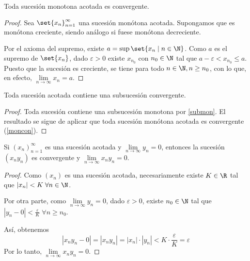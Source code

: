 \begin{proposition}
	\label{moncon}
	Toda sucesión monotona acotada es convergente.
\end{proposition}
\begin{proof}
	Sea \(\set{x_n}^{\infty}_{n = 1} \) una sucesión monótona acotada. Supongamos que es monótona creciente, siendo análogo si fuese monótona decreciente. 
	
	Por el axioma del supremo, existe \(a = \sup \set{x_n \mid n \in \N }\). Como \(a \) es el supremo de \(\set{x_n}\), dado \(\varepsilon > 0\) existe \(x_{n_0} \) con \(n_0 \in \N\) tal que \(a - \varepsilon < x_{n_0} \leq a\). Puesto que la sucesión es creciente, se tiene para todo \( n \in \N, n \geq  n_0\), con lo que, en efecto, \(\lim\limits_{n \to \infty} x_n = a\).   
\end{proof}
\begin{theorem}
	Toda sucesión acotada contiene una subsucesión convergente.
\end{theorem}
\begin{proof}
	Toda sucesión contiene una subsucesión monotona por \ref{submon}. El resultado se sigue de aplicar que toda sucesión monótona acotada es convergente (\ref{moncon}). 
\end{proof}

\begin{theorem}
	Si \((x_n)^{\infty}_{n=1} \) es una sucesión acotada y \(\lim\limits_{n \to \infty} y_n = 0 \), entonces la sucesión \((x_n y_n )\) es convergente y \(\lim\limits_{n \to \infty} x_n y_n = 0 \).
\end{theorem}
\begin{proof}
	Como \((x_n )\) es una sucesión acotada, necesariamente existe \(K \in \R \) tal que \(\left\vert x_n  \right\vert < K \; \forall n \in \N \).
	
	Por otra parte, como \(\lim\limits_{n \to \infty} y_n = 0\), dado \(\varepsilon > 0 \), existe \(n_0 \in \N \) tal que \(\left\vert y_n - 0  \right\vert < \frac{\varepsilon}{K} \; \forall n \geq n_0\).
	
	Así, obtenemos
	\[
		\left\vert x_n y_n - 0  \right\vert = \left\vert x_n y_n  \right\vert = \left\vert x_n  \right\vert \cdot \left\vert y_n  \right\vert < K \cdot \frac{\varepsilon}{K} = \varepsilon
	\]
	Por lo tanto, \(\lim\limits_{n \to \infty} x_n y_n = 0 \).
\end{proof}


